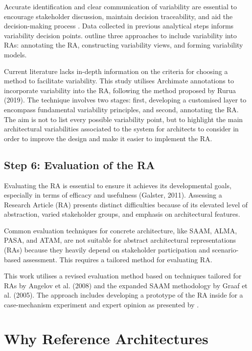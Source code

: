 \documentclass[journal]{IEEEtran}
\begin{document}
Accurate identification and clear communication of variability are essential to encourage stakeholder discussion, maintain decision traceability, and aid the decision-making process \cite{czarnecki2012cool}. Data collected in previous analytical steps informs variability decision points. \cite{galster2011empirically} outline three approaches to include variability into RAs: annotating the RA, constructing variability views, and forming variability models.

Current literature lacks in-depth information on the criteria for choosing a method to facilitate variability. This study utilises Archimate annotations to incorporate variability into the RA, following the method proposed by Rurua (2019). The technique involves two stages: first, developing a customised layer to encompass fundamental variability principles, and second, annotating the RA. The aim is not to list every possible variability point, but to highlight the main architectural variabilities associated to the system for architects to consider in order to improve the design and make it easier to implement the RA.

\subsection{Step 6: Evaluation of the RA}

Evaluating the RA is essential to ensure it achieves its developmental goals, especially in terms of efficacy and usefulness (Galster, 2011). Assessing a Research Article (RA) presents distinct difficulties because of its elevated level of abstraction, varied stakeholder groups, and emphasis on architectural features.

Common evaluation techniques for concrete architecture, like SAAM, ALMA, PASA, and ATAM, are not suitable for abstract architectural representations (RAs) because they heavily depend on stakeholder participation and scenario-based assessment. This requires a tailored method for evaluating RA.

This work utilises a revised evaluation method based on techniques tailored for RAs by Angelov et al. (2008) and the expanded SAAM methodology by Graaf et al. (2005). The approach includes developing a prototype of the RA inside for a case-mechanism experiment  and expert opinion as presented by \cite{wieringa2014design}.

\section{Why Reference Architectures}
\label{sec:why_reference_architectures}
\end{document}
